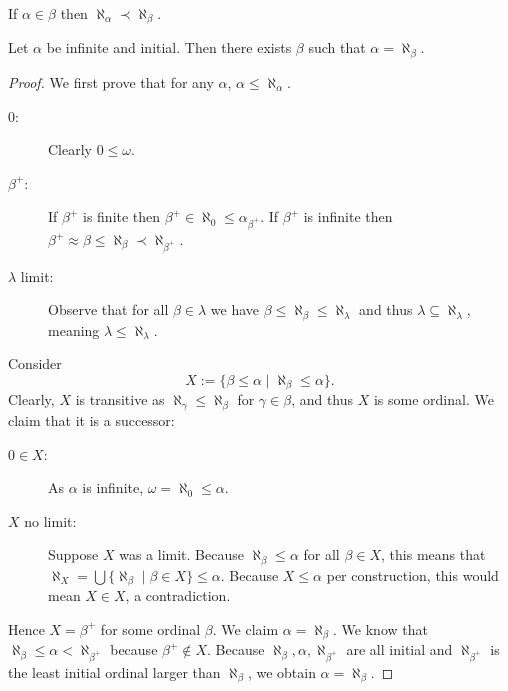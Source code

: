\documentclass{whrartcl}
\begin{document}
\begin{fact}
  If $\alpha \in \beta$ then $\aleph_\alpha \prec \aleph_\beta$.
\end{fact}

\begin{lemma}
  Let $\alpha$ be infinite and initial. Then there exists $\beta$ such that $\alpha = \aleph_\beta$.
\end{lemma}
\begin{proof}
  We first prove that for any $\alpha$, $\alpha \leq \aleph_\alpha$.
  \begin{description}
  \item[$0$:] Clearly $0 \leq \omega$.
  \item[$\beta^+$:] If $\beta^+$ is finite then $\beta^+ \in \aleph_0 \leq
    \alpha_{\beta^+}$. If $\beta^+$ is infinite then $\beta^+ \approx \beta \leq
    \aleph_\beta \prec \aleph_{\beta^+}$.
  \item[$\lambda$ limit:] Observe that for all $\beta \in \lambda$ we have
    $\beta \leq \aleph_\beta \leq \aleph_\lambda$ and thus $\lambda \subseteq
    \aleph_\lambda$, meaning $\lambda \leq \aleph_\lambda$.
  \end{description}

  Consider
  \[
    X := \{\beta \leq \alpha \mid \aleph_\beta \leq \alpha\}.
  \]
  Clearly, $X$ is transitive as $\aleph_\gamma \leq \aleph_\beta$ for $\gamma
  \in \beta$, and thus $X$ is some ordinal. We claim that it is a successor:
  \begin{description}
  \item[$0 \in X$:] As $\alpha$ is infinite, $\omega = \aleph_0 \leq \alpha$.
  \item[$X$ no limit:] Suppose $X$ was a limit. Because $\aleph_\beta \leq
    \alpha$ for all $\beta \in X$, this means that $\aleph_X = \bigcup
    \{\aleph_\beta \mid \beta \in X\} \leq \alpha$.
    Because $X \leq \alpha$ per construction, this
    would mean $X \in X$, a contradiction.
  \end{description}

  Hence $X = \beta^+$ for some ordinal $\beta$. We claim $\alpha =
  \aleph_\beta$. We know that $\aleph_\beta \leq \alpha < \aleph_{\beta^+}$
  because $\beta^+ \not\in X$. Because $\aleph_\beta, \alpha, \aleph_{\beta^+}$
  are all initial and $\aleph_{\beta^+}$ is the least initial ordinal larger
  than $\aleph_\beta$, we obtain $\alpha = \aleph_\beta$.
\end{proof}

\newpage
\end{document}
